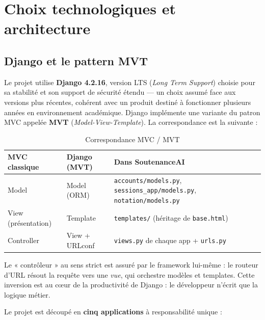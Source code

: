 \documentclass[12pt,a4paper]{report}
\begin{document}
\chapter{Choix technologiques et architecture}

\section{Django et le pattern MVT}
\label{sec:mvt}

Le projet utilise \textbf{Django 4.2.16}, version LTS (\emph{Long Term
Support}) choisie pour sa stabilité et son support de sécurité étendu ---
un choix assumé face aux versions plus récentes, cohérent avec un produit
destiné à fonctionner plusieurs années en environnement académique. Django
implémente une variante du patron MVC appelée \textbf{MVT}
(\emph{Model-View-Template}). La correspondance est la suivante :

\begin{table}[H]
\centering\small
\begin{tabular}{lll}
\toprule
\textbf{MVC classique} & \textbf{Django (MVT)} & \textbf{Dans SoutenanceAI} \\
\midrule
Model & Model (ORM) & \texttt{accounts/models.py}, \texttt{sessions\_app/models.py}, \texttt{notation/models.py} \\
View (présentation) & Template & \texttt{templates/} (héritage de \texttt{base.html}) \\
Controller & View + URLconf & \texttt{views.py} de chaque app + \texttt{urls.py} \\
\bottomrule
\end{tabular}
\caption{Correspondance MVC / MVT}
\end{table}

Le « contrôleur » au sens strict est assuré par le framework lui-même : le
routeur d'URL résout la requête vers une \emph{vue}, qui orchestre modèles et
templates. Cette inversion est au cœur de la productivité de Django : le
développeur n'écrit que la logique métier.

Le projet est découpé en \textbf{cinq applications} à responsabilité unique :
\end{document}
